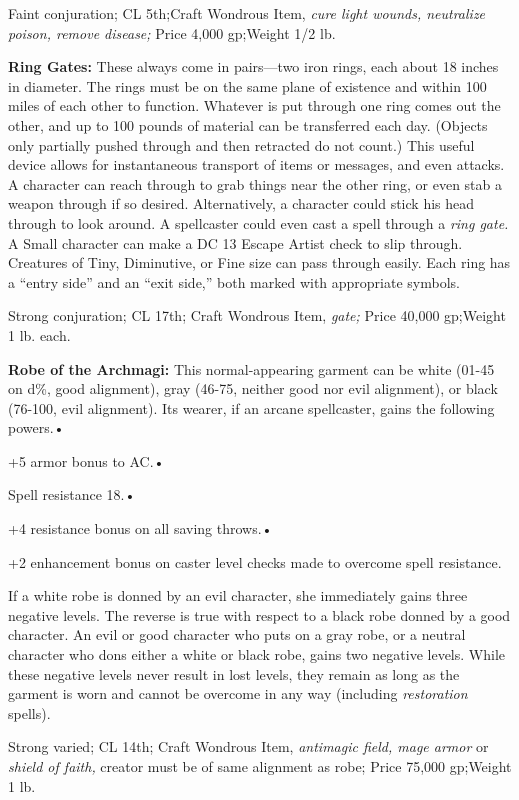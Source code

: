 Faint conjuration; CL 5th;Craft Wondrous Item, \textit{cure light wounds, neutralize 
poison, remove disease; }Price 4,000 gp;Weight 1/2 lb.

\textbf{Ring Gates:} These always come in pairs---two iron rings, each about 18 
inches in diameter. The rings must be on the same plane of existence and within 
100 miles of each other to function. Whatever is put through one ring comes out 
the other, and up to 100 pounds of material can be transferred each day. (Objects 
only partially pushed through and then retracted do not count.) This useful device 
allows for instantaneous transport of items or messages, and even attacks. A character 
can reach through to grab things near the other ring, or even stab a weapon through 
if so desired. Alternatively, a character could stick his head through to look 
around. A spellcaster could even cast a spell through a \textit{ring gate. }A Small 
character can make a DC 13 Escape Artist check to slip through. Creatures of Tiny, 
Diminutive, or Fine size can pass through easily. Each ring has a ``entry side'' 
and an ``exit side,'' both marked with appropriate symbols.

Strong conjuration; CL 17th; Craft Wondrous Item, \textit{gate; }Price 40,000 gp;Weight 
1 lb. each.

\textbf{Robe of the Archmagi:} This normal-appearing garment can be white (01-45 
on d\%, good alignment), gray (46-75, neither good nor evil alignment), or black 
(76-100, evil alignment). Its wearer, if an arcane spellcaster, gains the following 
powers.•

+5 armor bonus to AC.•

Spell resistance 18.•

+4 resistance bonus on all saving throws.•

+2 enhancement bonus on caster level checks made to overcome spell resistance.

If a white robe is donned by an evil character, she immediately gains three negative 
levels. The reverse is true with respect to a black robe donned by a good character. 
An evil or good character who puts on a gray robe, or a neutral character who dons 
either a white or black robe, gains two negative levels. While these negative levels 
never result in lost levels, they remain as long as the garment is worn and cannot 
be overcome in any way (including \textit{restoration }spells).

Strong varied; CL 14th; Craft Wondrous Item, \textit{antimagic field, mage armor 
}or \textit{shield of faith, }creator must be of same alignment as robe; Price 
75,000 gp;Weight 1 lb.

